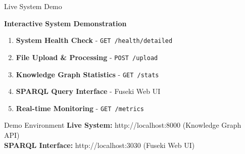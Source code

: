 \documentclass[aspectratio=169]{beamer}
\begin{document}
\begin{frame}{Live System Demo}
    \begin{center}
        \textbf{Interactive System Demonstration}
        
        \vspace{1cm}
        
        \begin{enumerate}
            \item \textbf{System Health Check} - \texttt{GET /health/detailed}
            \item \textbf{File Upload \& Processing} - \texttt{POST /upload}
            \item \textbf{Knowledge Graph Statistics} - \texttt{GET /stats}
            \item \textbf{SPARQL Query Interface} - Fuseki Web UI
            \item \textbf{Real-time Monitoring} - \texttt{GET /metrics}
        \end{enumerate}
        
        \vspace{1cm}
        
        \begin{alertblock}{Demo Environment}
            \textbf{Live System:} http://localhost:8000 (Knowledge Graph API)\\
            \textbf{SPARQL Interface:} http://localhost:3030 (Fuseki Web UI)
        \end{alertblock}
    \end{center}
\end{frame}
\end{document}
